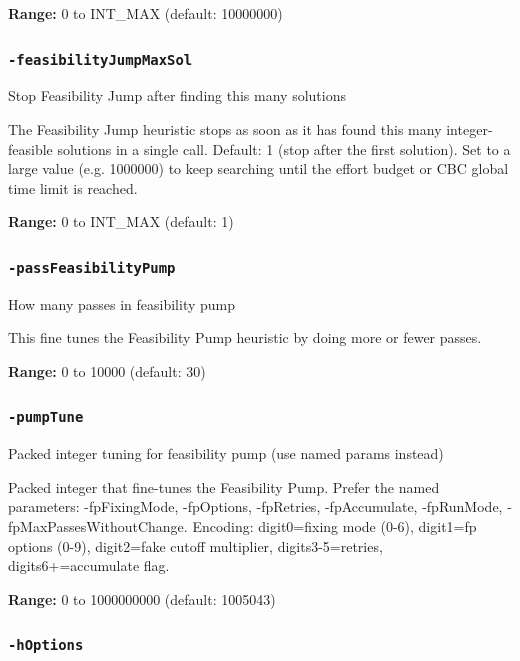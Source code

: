 \documentclass[11pt,a4paper]{article}
\begin{document}
\textbf{Range:} 0 to INT\_MAX (default: 10000000)

\subsubsection*{\texttt{-feasibilityJumpMaxSol}}

Stop Feasibility Jump after finding this many solutions

The Feasibility Jump heuristic stops as soon as it has found this many integer-feasible solutions in a single call. Default: 1 (stop after the first solution). Set to a large value (e.g. 1000000) to keep searching until the effort budget or CBC global time limit is reached.

\textbf{Range:} 0 to INT\_MAX (default: 1)

\subsubsection*{\texttt{-passFeasibilityPump}}

How many passes in feasibility pump

This fine tunes the Feasibility Pump heuristic by doing more or fewer passes.

\textbf{Range:} 0 to 10000 (default: 30)

\subsubsection*{\texttt{-pumpTune}}

Packed integer tuning for feasibility pump (use named params instead)

Packed integer that fine-tunes the Feasibility Pump. Prefer the named parameters: -fpFixingMode, -fpOptions, -fpRetries, -fpAccumulate, -fpRunMode, -fpMaxPassesWithoutChange.
Encoding: digit0=fixing mode (0-6), digit1=fp options (0-9), digit2=fake cutoff multiplier, digits3-5=retries, digits6+=accumulate flag.

\textbf{Range:} 0 to 1000000000 (default: 1005043)

\subsubsection*{\texttt{-hOptions}}
\end{document}
